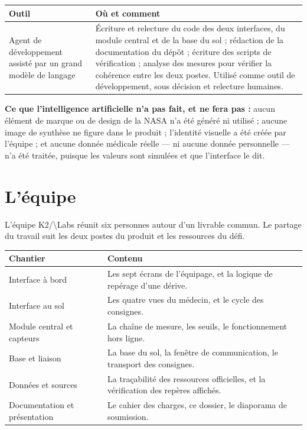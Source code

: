 \documentclass[11pt,a4paper]{article}
\let\sectionorig\section
\renewcommand{\section}{\Needspace{5\baselineskip}\sectionorig}
\newcommand{\kl}{K2/\textbackslash{}Labs}
\begin{document}
\begin{tabularx}{\textwidth}{@{}L{3.6cm} X@{}}
\toprule
\textbf{Outil} & \textbf{O\`u et comment} \\
\midrule
Agent de d\'eveloppement assist\'e par un grand mod\`ele de langage & \'Ecriture et relecture du code des deux interfaces, du module central et de la base du sol ; r\'edaction de la documentation du d\'ep\^ot ; \'ecriture des scripts de v\'erification ; analyse des mesures pour v\'erifier la coh\'erence entre les deux postes. Utilis\'e comme outil de d\'eveloppement, sous d\'ecision et relecture humaines. \\
\bottomrule
\end{tabularx}

\textbf{Ce que l'intelligence artificielle n'a pas fait, et ne fera pas :} aucun \'el\'ement de marque
ou de design de la NASA n'a \'et\'e g\'en\'er\'e ni utilis\'e ; aucune image de synth\`ese ne figure
dans le produit ; l'identit\'e visuelle a \'et\'e cr\'e\'ee par l'\'equipe ; et aucune donn\'ee
m\'edicale r\'eelle --- ni aucune donn\'ee personnelle --- n'a \'et\'e trait\'ee, puisque les valeurs
sont simul\'ees et que l'interface le dit.

\section{L'\'equipe}

L'\'equipe \kl{} r\'eunit six personnes autour d'un livrable commun. Le partage du travail suit les
deux postes du produit et les ressources du d\'efi.

\begin{tabularx}{\textwidth}{@{}L{4.6cm} X@{}}
\toprule
\textbf{Chantier} & \textbf{Contenu} \\
\midrule
Interface \`a bord & Les sept \'ecrans de l'\'equipage, et la logique de rep\'erage d'une d\'erive. \\
Interface au sol & Les quatre vues du m\'edecin, et le cycle des consignes. \\
Module central et capteurs & La cha\^ine de mesure, les seuils, le fonctionnement hors ligne. \\
Base et liaison & La base du sol, la fen\^etre de communication, le transport des consignes. \\
Donn\'ees et sources & La tra\c{c}abilit\'e des ressources officielles, et la v\'erification des rep\`eres affich\'es. \\
Documentation et pr\'esentation & Le cahier des charges, ce dossier, le diaporama de soumission. \\
\bottomrule
\end{tabularx}
\end{document}
